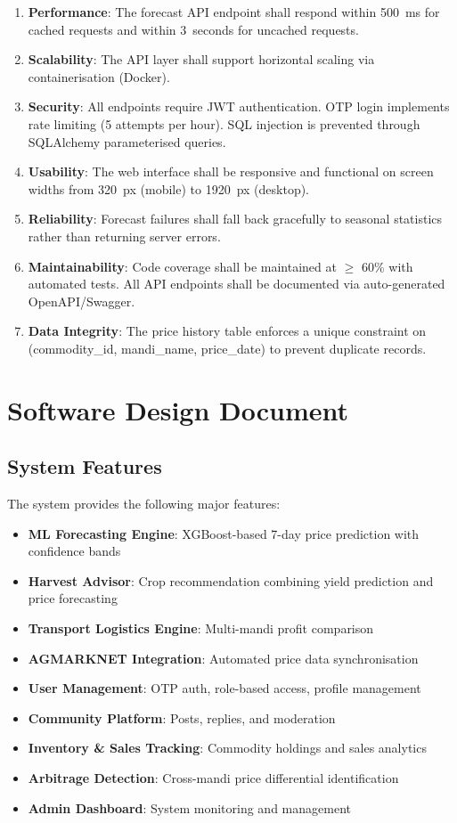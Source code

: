\documentclass[12pt,a4paper]{report}
\begin{document}
\begin{enumerate}
    \item \textbf{Performance}: The forecast API endpoint shall respond within 500~ms for
    cached requests and within 3~seconds for uncached requests.
    \item \textbf{Scalability}: The API layer shall support horizontal scaling via
    containerisation (Docker).
    \item \textbf{Security}: All endpoints require JWT authentication. OTP login implements
    rate limiting (5 attempts per hour). SQL injection is prevented through SQLAlchemy
    parameterised queries.
    \item \textbf{Usability}: The web interface shall be responsive and functional on
    screen widths from 320~px (mobile) to 1920~px (desktop).
    \item \textbf{Reliability}: Forecast failures shall fall back gracefully to seasonal
    statistics rather than returning server errors.
    \item \textbf{Maintainability}: Code coverage shall be maintained at $\geq$ 60\% with
    automated tests. All API endpoints shall be documented via auto-generated OpenAPI/Swagger.
    \item \textbf{Data Integrity}: The price history table enforces a unique constraint on
    (commodity\_id, mandi\_name, price\_date) to prevent duplicate records.
\end{enumerate}

\section{Software Design Document}

\subsection{System Features}

The system provides the following major features:
\begin{itemize}
    \item \textbf{ML Forecasting Engine}: XGBoost-based 7-day price prediction with confidence bands
    \item \textbf{Harvest Advisor}: Crop recommendation combining yield prediction and price forecasting
    \item \textbf{Transport Logistics Engine}: Multi-mandi profit comparison
    \item \textbf{AGMARKNET Integration}: Automated price data synchronisation
    \item \textbf{User Management}: OTP auth, role-based access, profile management
    \item \textbf{Community Platform}: Posts, replies, and moderation
    \item \textbf{Inventory \& Sales Tracking}: Commodity holdings and sales analytics
    \item \textbf{Arbitrage Detection}: Cross-mandi price differential identification
    \item \textbf{Admin Dashboard}: System monitoring and management
\end{itemize}
\end{document}
